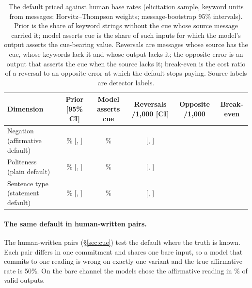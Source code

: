 \begin{table}[t]
\caption{The default priced against human base rates (elicitation sample, \jmtTwoUnits{} keyword units from \jmtTwoMessages{} messages; Horvitz--Thompson weights; message-bootstrap 95\% intervals). Prior is the share of keyword strings without the cue whose source message carried it; model asserts cue is the share of such inputs for which the model's output asserts the cue-bearing value. Reversals are messages whose source has the cue, whose keywords lack it and whose output lacks it; the opposite error is an output that asserts the cue when the source lacks it; break-even is the cost ratio of a reversal to an opposite error at which the default stops paying. Source labels are detector labels.}\label{tab:basecost}
\footnotesize
\begin{tabular}{@{}lccccc@{}}
\toprule
Dimension & Prior [95\% CI] & Model asserts cue & Reversals /1,000 [CI] & Opposite /1,000 & Break-even \\
\midrule
Negation (affirmative default) & \jmtTwoPostPol{}\% [\jmtTwoPostPolLo{}, \jmtTwoPostPolHi{}] & \jmtTwoModelCuePol{}\% & \jmtTwoRevPol{} [\jmtTwoRevPolLo{}, \jmtTwoRevPolHi{}] & \jmtTwoSpurPol{} & \jmtTwoBreakPol{} \\
Politeness (plain default) & \jmtTwoPostPolite{}\% [\jmtTwoPostPoliteLo{}, \jmtTwoPostPoliteHi{}] & \jmtTwoModelCuePolite{}\% & \jmtTwoRevPolite{} [\jmtTwoRevPoliteLo{}, \jmtTwoRevPoliteHi{}] & \jmtTwoSpurPolite{} & \jmtTwoBreakPolite{} \\
Sentence type (statement default) & \jmtTwoPostAct{}\% [\jmtTwoPostActLo{}, \jmtTwoPostActHi{}] & \jmtTwoModelCueAct{}\% & \jmtTwoRevAct{} [\jmtTwoRevActLo{}, \jmtTwoRevActHi{}] & \jmtTwoSpurAct{} & \jmtTwoBreakAct{} \\
\bottomrule
\end{tabular}
\end{table}

\paragraph{The same default in human-written pairs.}
The human-written pairs (\S\ref{sec:cue}) test the default where the truth is known. Each pair differs in one commitment and shares one bare input, so a model that commits to one reading is wrong on exactly one variant and the true affirmative rate is 50\%. On the bare channel the models chose the affirmative reading in \jmtTwoHwAffShare{}\% of valid outputs.

